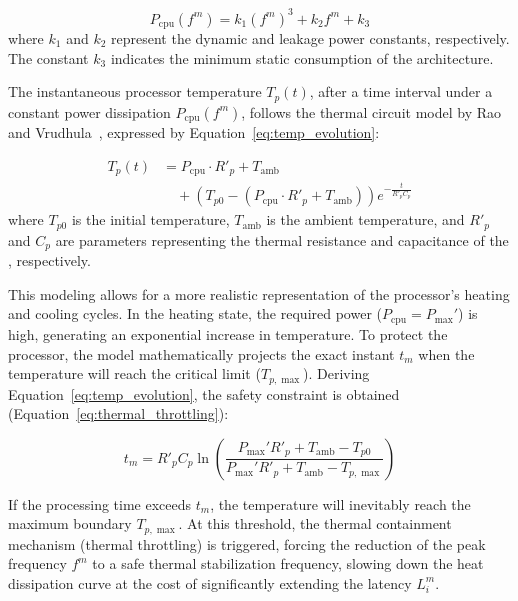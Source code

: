 \begin{equation}
\label{eq:power_cpu}
P_{\mathrm{cpu}}(f^m) = k_1 (f^m)^3 + k_2 f^m + k_3
\end{equation}
where $k_1$ and $k_2$ represent the dynamic and leakage power constants, respectively. The constant $k_3$ indicates the minimum static consumption of the architecture.

The instantaneous processor temperature $T_p(t)$, after a time interval under a constant power dissipation $P_{\mathrm{cpu}}(f^m)$, follows the  thermal circuit model by Rao and Vrudhula~\cite{rao2007performance}, expressed by Equation~\ref{eq:temp_evolution}:

\begin{equation}
\label{eq:temp_evolution}
\begin{split}
T_p(t) &= P_{\mathrm{cpu}} \cdot R'_p + T_{\mathrm{amb}} \\
&\quad + (T_{p0} - (P_{\mathrm{cpu}} \cdot R'_p + T_{\mathrm{amb}})) e^{-\frac{t}{R'_p C_p}}
\end{split}
\end{equation}
where $T_{p0}$ is the initial temperature, $T_{\mathrm{amb}}$ is the ambient temperature, and $R'_p$ and $C_p$ are parameters representing the thermal resistance and capacitance of the , respectively.

This modeling allows for a more realistic representation of the processor's heating and cooling cycles. In the heating state, the required power ($P_{\mathrm{cpu}} = P_{\max}'$) is high, generating an exponential increase in temperature. To protect the processor, the model mathematically projects the exact instant $t_m$ when the temperature will reach the critical limit ($T_{p,\max}$). Deriving Equation~\ref{eq:temp_evolution}, the safety constraint is obtained (Equation~\ref{eq:thermal_throttling}):

\begin{equation}
\label{eq:thermal_throttling}
t_m = R'_p C_p \ln\left(\frac{P_{\max}' R'_p + T_{\mathrm{amb}} - T_{p0}}{P_{\max}' R'_p + T_{\mathrm{amb}} - T_{p,\max}}\right)
\end{equation}

If the processing time exceeds $t_m$, the temperature will inevitably reach the maximum boundary $T_{p,\max}$. At this threshold, the thermal containment mechanism (thermal throttling) is triggered, forcing the reduction of the peak frequency $f^m$ to a safe thermal stabilization frequency, slowing down the heat dissipation curve at the cost of significantly extending the latency $L_i^m$.

